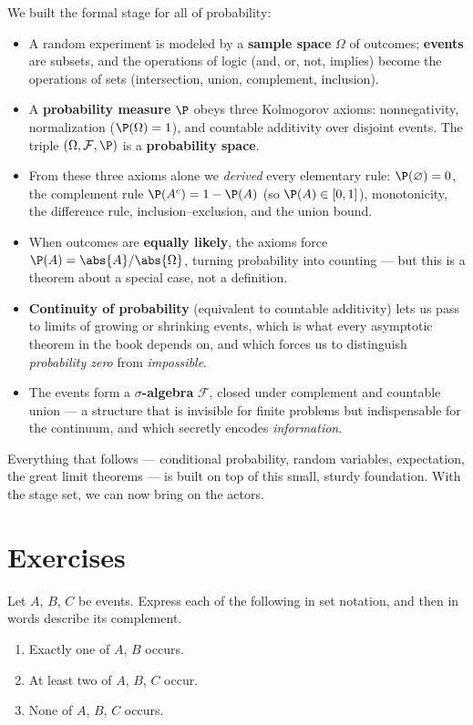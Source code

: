 We built the formal stage for all of probability:
\begin{itemize}
\item A random experiment is modeled by a \textbf{sample space} $\Omega$ of
outcomes; \textbf{events} are subsets, and the operations of logic (and, or, not,
implies) become the operations of sets (intersection, union, complement,
inclusion).
\item A \textbf{probability measure} $\P$ obeys three Kolmogorov axioms:
nonnegativity, normalization ($\P(\Omega)=1$), and countable additivity over
disjoint events. The triple $(\Omega, \mathcal{F}, \P)$ is a \textbf{probability
space}.
\item From these three axioms alone we \emph{derived} every elementary rule:
$\P(\varnothing)=0$, the complement rule $\P(A^c)=1-\P(A)$ (so $\P(A)\in[0,1]$),
monotonicity, the difference rule, inclusion--exclusion, and the union bound.
\item When outcomes are \textbf{equally likely}, the axioms force
$\P(A) = \abs{A}/\abs{\Omega}$, turning probability into counting --- but this is
a theorem about a special case, not a definition.
\item \textbf{Continuity of probability} (equivalent to countable additivity)
lets us pass to limits of growing or shrinking events, which is what every
asymptotic theorem in the book depends on, and which forces us to distinguish
\emph{probability zero} from \emph{impossible}.
\item The events form a \textbf{$\sigma$-algebra} $\mathcal{F}$, closed under
complement and countable union --- a structure that is invisible for finite
problems but indispensable for the continuum, and which secretly encodes
\emph{information}.
\end{itemize}

Everything that follows --- conditional probability, random variables,
expectation, the great limit theorems --- is built on top of this small, sturdy
foundation. With the stage set, we can now bring on the actors.

\section{Exercises}
\label{ch03:exercises}

\begin{exercise}
\label{ch03:exr-translate}
Let $A$, $B$, $C$ be events. Express each of the following in set notation, and
then in words describe its complement.
\begin{enumerate}[label=(\alph*)]
\item Exactly one of $A$, $B$ occurs.
\item At least two of $A$, $B$, $C$ occur.
\item None of $A$, $B$, $C$ occurs.
\end{enumerate}
\end{exercise}

